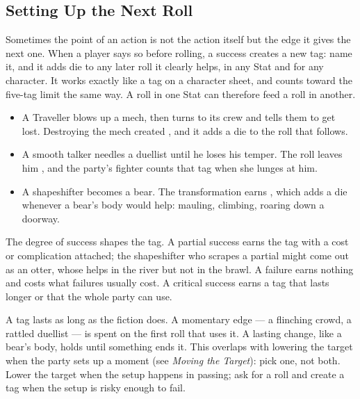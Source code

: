 \subsection*{Setting Up the Next Roll}
Sometimes the point of an action is not the action itself but the edge
it gives the next one. When a player says so before rolling, a success
creates a new tag: name it, and it adds  die to any later roll
it clearly helps, in any Stat and for any character. It works exactly
like a tag on a character sheet, and counts toward the five-tag limit
the same way. A roll in one Stat can therefore feed a roll in another.
\begin{itemize}
  \item A Traveller blows up a mech, then turns to its crew and tells
    them to get lost. Destroying the mech created
    , and it adds a die to the
     roll that follows.
  \item A smooth talker needles a duellist until he loses his temper.
    The  roll leaves him , and the
    party's fighter counts that tag when she lunges at him.
  \item A shapeshifter becomes a bear. The transformation earns
    , which adds a die whenever a bear's body would
    help: mauling, climbing, roaring down a doorway.
\end{itemize}
The degree of success shapes the tag. A partial success earns the tag
with a cost or complication attached; the shapeshifter who scrapes a
partial might come out as an otter, whose  helps
in the river but not in the brawl. A failure earns nothing and costs
what failures usually cost. A critical success earns a tag that lasts
longer or that the whole party can use.

A tag lasts as long as the fiction does. A momentary edge --- a
flinching crowd, a rattled duellist --- is spent on the first roll that
uses it. A lasting change, like a bear's body, holds until something
ends it. This overlaps with lowering the target when the party sets up
a moment (see \emph{Moving the Target}): pick one, not both. Lower the
target when the setup happens in passing; ask for a roll and create a
tag when the setup is risky enough to fail.

